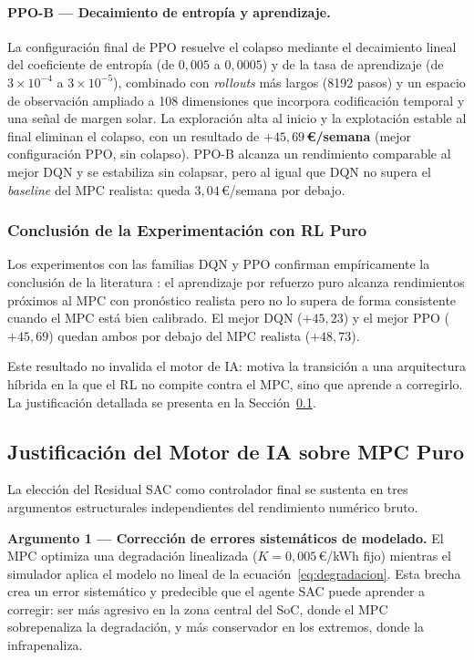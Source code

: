 \documentclass[12pt, a4paper, twoside]{report}
\begin{document}
\paragraph{PPO-B — Decaimiento de entropía y aprendizaje.}
La configuración final de PPO resuelve el colapso mediante el decaimiento
lineal del coeficiente de entropía (de $0{,}005$ a $0{,}0005$) y de la tasa de
aprendizaje (de $3\times10^{-4}$ a $3\times10^{-5}$), combinado con
\textit{rollouts} más largos (8192 pasos) y un espacio de observación ampliado
a 108 dimensiones que incorpora codificación temporal y una señal de margen
solar. La exploración alta al inicio y la explotación estable al final
eliminan el colapso, con un resultado de \textbf{$+45{,}69$\,€/semana} (mejor
configuración PPO, sin colapso). PPO-B alcanza un rendimiento comparable al
mejor DQN y se estabiliza sin colapsar, pero al igual que DQN no supera el
\textit{baseline} del MPC realista: queda $3{,}04$\,€/semana por debajo.

\subsubsection{Conclusión de la Experimentación con RL Puro}

Los experimentos con las familias DQN y PPO confirman empíricamente la
conclusión de la literatura \citep{Zhan2023}: el aprendizaje por refuerzo puro
alcanza rendimientos próximos al MPC con pronóstico realista pero no lo supera
de forma consistente cuando el MPC está bien calibrado. El mejor DQN
($+45{,}23$) y el mejor PPO ($+45{,}69$) quedan ambos por debajo del MPC
realista ($+48{,}73$).

Este resultado no invalida el motor de IA: motiva la transición a una
arquitectura híbrida en la que el RL no compite contra el MPC, sino que aprende
a corregirlo. La justificación detallada se presenta en la
Sección~\ref{sub:justificacion}.

\subsection{Justificación del Motor de IA sobre MPC Puro}
\label{sub:justificacion}

La elección del Residual SAC como controlador final se sustenta en tres
argumentos estructurales independientes del rendimiento numérico bruto.

\textbf{Argumento 1 — Corrección de errores sistemáticos de modelado.} El MPC
optimiza una degradación linealizada ($K = 0{,}005$\,€/kWh fijo) mientras el
simulador aplica el modelo no lineal de la ecuación~\eqref{eq:degradacion}.
Esta brecha crea un error sistemático y predecible que el agente SAC puede
aprender a corregir: ser más agresivo en la zona central del SoC, donde el MPC
sobrepenaliza la degradación, y más conservador en los extremos, donde la
infrapenaliza.
\end{document}
